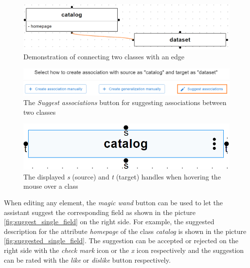 \begin{figure}[!h]
    \includegraphics[scale=0.32]{../docs/images/frontend/edge-drag.png}
    \caption{\centering Demonstration of connecting two classes with an edge}
    \label{fig:edge_drag}
\end{figure}


\begin{figure}[!h]
    \includegraphics[scale=0.33]{../docs/images/frontend/suggest-associations-2.png}
    \caption{\centering The \textit{Suggest associations} button for suggesting associations between two classes}
    \label{fig:suggest_associations_2}
\end{figure}


\begin{figure}[!h]
    \includegraphics[scale=0.3]{../docs/images/frontend/handles.png}
    \caption{\centering The displayed \textit{s} (source) and \textit{t} (target) handles when hovering the mouse over a class}
    \label{fig:handles}
\end{figure}


When editing any element, the \textit{magic wand} button can be used to let the assistant suggest the corresponding field as shown in the picture \ref{fig:suggest_single_field} on the right side. For example, the suggested description for the attribute \textit{homepage} of the class \textit{catalog} is shown in the picture \ref{fig:suggested_single_field}. The suggestion can be accepted or rejected on the right side with the \textit{check mark} icon or the \textit{x} icon respectively and the suggestion can be rated with the \textit{like} or \textit{dislike} button respectively.

